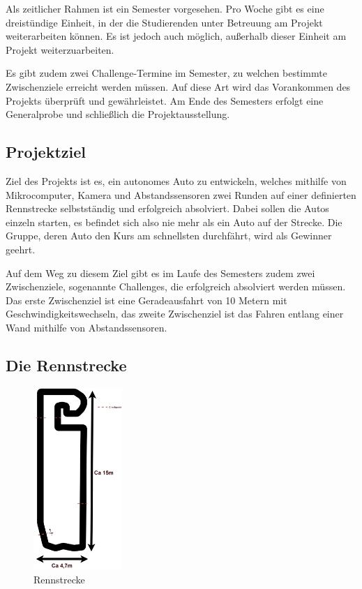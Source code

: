 \documentclass[a4paper, 12pt]{scrartcl}
\begin{document}
Als zeitlicher Rahmen ist ein Semester vorgesehen. Pro Woche gibt es eine dreistündige Einheit, in der die Studierenden unter Betreuung am Projekt weiterarbeiten können. Es ist jedoch auch möglich, außerhalb dieser Einheit am Projekt weiterzuarbeiten.

Es gibt zudem zwei Challenge-Termine im Semester, zu welchen bestimmte Zwischenziele erreicht werden müssen. Auf diese Art wird das Vorankommen des Projekts überprüft und gewährleistet. Am Ende des Semesters erfolgt eine Generalprobe und schließlich die Projektausstellung.

\subsection{Projektziel}

Ziel des Projekts ist es, ein autonomes Auto zu entwickeln, welches mithilfe von Mikrocomputer, Kamera und Abstandssensoren zwei Runden auf einer definierten Rennstrecke selbstständig und erfolgreich absolviert. Dabei sollen die Autos einzeln starten, es befindet sich also nie mehr als ein Auto auf der Strecke. Die Gruppe, deren Auto den Kurs am schnellsten durchfährt, wird als Gewinner geehrt.

Auf dem Weg zu diesem Ziel gibt es im Laufe des Semesters zudem zwei Zwischenziele, sogenannte Challenges, die erfolgreich absolviert werden müssen. Das erste Zwischenziel ist eine Geradeausfahrt von 10 Metern mit Geschwindigkeitswechseln, das zweite Zwischenziel ist das Fahren entlang einer Wand mithilfe von Abstandssensoren.

\subsection{Die Rennstrecke}

\begin{figure}
	\centering
	\includegraphics[width=0.3\textwidth]{Rennstrecke.png}
	\caption{Rennstrecke}
	\label{rennstrecke}
\end{figure}
\end{document}
